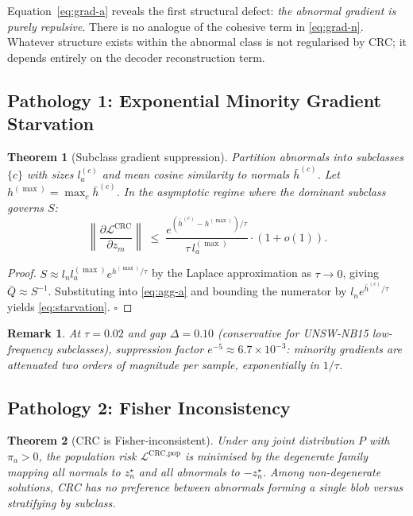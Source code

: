 \documentclass[conference]{IEEEtran}
\newtheorem{theorem}{Theorem}
\newtheorem{remark}{Remark}
\begin{document}
Equation~\eqref{eq:grad-a} reveals the first structural defect:
\emph{the abnormal gradient is purely repulsive}. There is no
analogue of the cohesive term in \eqref{eq:grad-n}.
Whatever structure exists within the abnormal class is not
regularised by CRC; it depends entirely on the decoder reconstruction term.

\subsection{Pathology 1: Exponential Minority Gradient Starvation}

\begin{theorem}[Subclass gradient suppression]\label{lem:starvation}
Partition abnormals into subclasses $\{c\}$ with sizes $l_a^{(c)}$
and mean cosine similarity to normals $\bar{h}^{(c)}$.
Let $h^{(\max)} = \max_c \bar{h}^{(c)}$.
In the asymptotic regime where the dominant subclass governs $S$:
\begin{equation}
\left\|\frac{\partial \mathcal{L}^{\text{CRC}}}{\partial z_m}\right\|
\;\le\;
\frac{e^{(\bar{h}^{(c)} - h^{(\max)})/\tau}}{\tau\, l_a^{(\max)}}
\cdot (1 + o(1)).
\label{eq:starvation}
\end{equation}
\end{theorem}

\begin{proof}
$S \approx l_n l_a^{(\max)} e^{h^{(\max)}/\tau}$ by the Laplace
approximation as $\tau \to 0$, giving $\bar{Q} \approx S^{-1}$.
Substituting into \eqref{eq:agg-a} and bounding the numerator by
$l_n e^{\bar{h}^{(c)}/\tau}$ yields \eqref{eq:starvation}. $\square$
\end{proof}

\begin{remark}
At $\tau = 0.02$ and gap $\Delta = 0.10$ (conservative for UNSW-NB15
low-frequency subclasses), suppression factor $e^{-5} \approx 6.7 \times 10^{-3}$:
minority gradients are attenuated two orders of magnitude \emph{per sample},
exponentially in $1/\tau$.
\end{remark}

\subsection{Pathology 2: Fisher Inconsistency}

\begin{theorem}[CRC is Fisher-inconsistent]\label{thm:fisher-crc}
Under any joint distribution $P$ with $\pi_a > 0$, the population
risk $\mathcal{L}^{\text{CRC,pop}}$ is minimised by the \emph{degenerate}
family mapping all normals to $z_n^\star$ and all abnormals to $-z_n^\star$.
Among non-degenerate solutions, CRC has \emph{no preference} between
abnormals forming a single blob versus stratifying by subclass.
\end{theorem}
\end{document}
